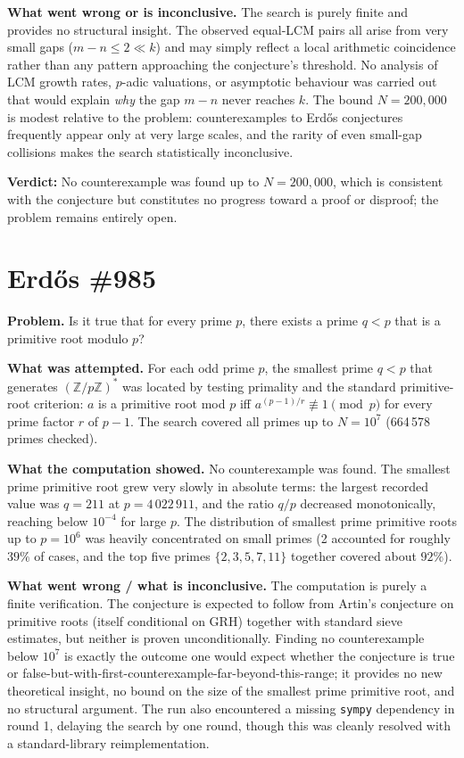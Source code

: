 \documentclass[11pt]{article}
\begin{document}
\textbf{What went wrong or is inconclusive.} The search is purely finite and provides no structural insight. The observed equal-LCM pairs all arise from very small gaps ($m - n \leq 2 \ll k$) and may simply reflect a local arithmetic coincidence rather than any pattern approaching the conjecture's threshold. No analysis of LCM growth rates, $p$-adic valuations, or asymptotic behaviour was carried out that would explain \emph{why} the gap $m - n$ never reaches $k$. The bound $N = 200{,}000$ is modest relative to the problem: counterexamples to Erd\H{o}s conjectures frequently appear only at very large scales, and the rarity of even small-gap collisions makes the search statistically inconclusive.

\textbf{Verdict:} No counterexample was found up to $N = 200{,}000$, which is consistent with the conjecture but constitutes no progress toward a proof or disproof; the problem remains entirely open.

\clearpage

\section{Erdős \#985}

\textbf{Problem.} Is it true that for every prime $p$, there exists a prime $q < p$ that is a primitive root modulo $p$?

\textbf{What was attempted.} For each odd prime $p$, the smallest prime $q < p$ that generates $(\mathbb{Z}/p\mathbb{Z})^*$ was located by testing primality and the standard primitive-root criterion: $a$ is a primitive root mod $p$ iff $a^{(p-1)/r} \not\equiv 1 \pmod{p}$ for every prime factor $r$ of $p-1$. The search covered all primes up to $N = 10^7$ (664\,578 primes checked).

\textbf{What the computation showed.} No counterexample was found. The smallest prime primitive root grew very slowly in absolute terms: the largest recorded value was $q = 211$ at $p = 4\,022\,911$, and the ratio $q/p$ decreased monotonically, reaching below $10^{-4}$ for large $p$. The distribution of smallest prime primitive roots up to $p = 10^6$ was heavily concentrated on small primes (2 accounted for roughly $39\%$ of cases, and the top five primes $\{2,3,5,7,11\}$ together covered about $92\%$).

\textbf{What went wrong / what is inconclusive.} The computation is purely a finite verification. The conjecture is expected to follow from Artin's conjecture on primitive roots (itself conditional on GRH) together with standard sieve estimates, but neither is proven unconditionally. Finding no counterexample below $10^7$ is exactly the outcome one would expect whether the conjecture is true or false-but-with-first-counterexample-far-beyond-this-range; it provides no new theoretical insight, no bound on the size of the smallest prime primitive root, and no structural argument. The run also encountered a missing \texttt{sympy} dependency in round 1, delaying the search by one round, though this was cleanly resolved with a standard-library reimplementation.
\end{document}
